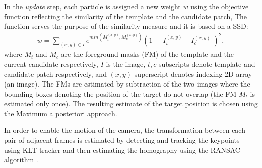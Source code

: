 In the \textit{update} step, each particle is assigned a new weight $w$ using the objective function reflecting the similarity of the template and the candidate patch, The function serves the purpose of the similarity measure and it is based on a SSD:
\begin{align} \label{eq:bgfg_distance_function}
	w = \sum_{(x,y) \in I}{e^{min(M_{t}^{(x,y)}, M_{c}^{(x,y)})}(1 - |I_{t}^{(x,y)} - I_{c}^{(x,y)}|)^{2}},
\end{align}
where $M_{t}$ and $M_{c}$ are the foreground masks (FM) of the template and the current candidate respectively, $I$ is the image, $t, c$ subscripts denote template and candidate patch respectively, and $(x,y)$ superscript denotes indexing 2D array (an image). The FMs are estimated by subtraction of the two images where the bounding boxes denoting the position of the target do not overlap (the FM $M_{t}$ is estimated only once). The resulting estimate of the target position is chosen using the Maximum a posteriori approach.

In order to enable the motion of the camera, the transformation between each pair of adjacent frames is estimated by detecting and tracking the keypoints using KLT tracker \cite{Tomasi91detectionand} and then estimating the homography using the RANSAC algorithm \cite{Hartley:2003:MVG:861369}.

%
%

